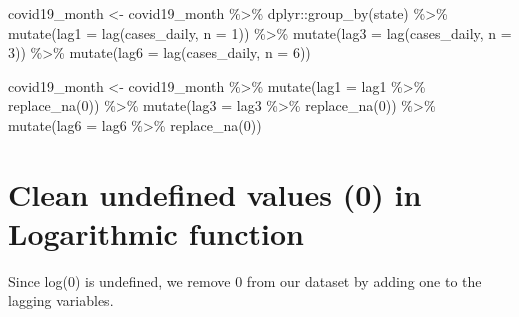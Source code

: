 \documentclass[
]{book}
\newenvironment{Shaded}{\begin{snugshade}}{\end{snugshade}}
\newcommand{\AttributeTok}[1]{\textcolor[rgb]{0.77,0.63,0.00}{#1}}
\newcommand{\DecValTok}[1]{\textcolor[rgb]{0.00,0.00,0.81}{#1}}
\newcommand{\FunctionTok}[1]{\textcolor[rgb]{0.00,0.00,0.00}{#1}}
\newcommand{\NormalTok}[1]{#1}
\newcommand{\OtherTok}[1]{\textcolor[rgb]{0.56,0.35,0.01}{#1}}
\newcommand{\SpecialCharTok}[1]{\textcolor[rgb]{0.00,0.00,0.00}{#1}}
\begin{document}
\begin{Shaded}
\begin{Highlighting}[]
\NormalTok{covid19\_month }\OtherTok{\textless{}{-}}\NormalTok{ covid19\_month }\SpecialCharTok{\%\textgreater{}\%}
\NormalTok{  dplyr}\SpecialCharTok{::}\FunctionTok{group\_by}\NormalTok{(state) }\SpecialCharTok{\%\textgreater{}\%}
  \FunctionTok{mutate}\NormalTok{(}\AttributeTok{lag1 =} \FunctionTok{lag}\NormalTok{(cases\_daily, }\AttributeTok{n =} \DecValTok{1}\NormalTok{)) }\SpecialCharTok{\%\textgreater{}\%}
  \FunctionTok{mutate}\NormalTok{(}\AttributeTok{lag3 =} \FunctionTok{lag}\NormalTok{(cases\_daily, }\AttributeTok{n =} \DecValTok{3}\NormalTok{)) }\SpecialCharTok{\%\textgreater{}\%}
  \FunctionTok{mutate}\NormalTok{(}\AttributeTok{lag6 =} \FunctionTok{lag}\NormalTok{(cases\_daily, }\AttributeTok{n =} \DecValTok{6}\NormalTok{)) }

\NormalTok{covid19\_month }\OtherTok{\textless{}{-}}\NormalTok{ covid19\_month }\SpecialCharTok{\%\textgreater{}\%} 
  \FunctionTok{mutate}\NormalTok{(}\AttributeTok{lag1 =}\NormalTok{ lag1 }\SpecialCharTok{\%\textgreater{}\%} \FunctionTok{replace\_na}\NormalTok{(}\DecValTok{0}\NormalTok{)) }\SpecialCharTok{\%\textgreater{}\%}
  \FunctionTok{mutate}\NormalTok{(}\AttributeTok{lag3 =}\NormalTok{ lag3 }\SpecialCharTok{\%\textgreater{}\%} \FunctionTok{replace\_na}\NormalTok{(}\DecValTok{0}\NormalTok{)) }\SpecialCharTok{\%\textgreater{}\%}
  \FunctionTok{mutate}\NormalTok{(}\AttributeTok{lag6 =}\NormalTok{ lag6 }\SpecialCharTok{\%\textgreater{}\%} \FunctionTok{replace\_na}\NormalTok{(}\DecValTok{0}\NormalTok{))}
\end{Highlighting}
\end{Shaded}

\hypertarget{clean-undefined-values-0-in-logarithmic-function}{%
\section{Clean undefined values (0) in Logarithmic function}\label{clean-undefined-values-0-in-logarithmic-function}}

Since log(0) is undefined, we remove 0 from our dataset by adding one to the lagging variables.
\end{document}
